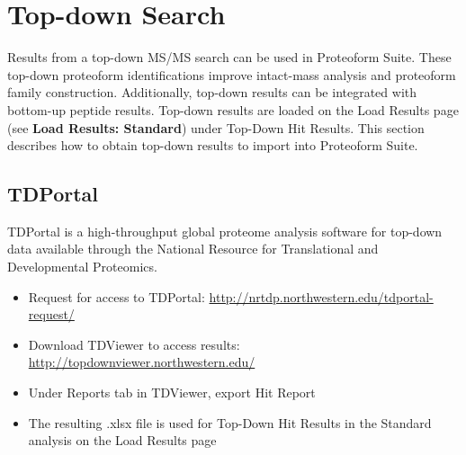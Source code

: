
\section{Top-down Search}

Results from a top-down MS/MS search can be used in Proteoform Suite. These top-down proteoform identifications improve intact-mass analysis and proteoform family construction. Additionally, top-down results can be integrated with bottom-up peptide results. Top-down results are loaded on the Load Results page (see \textbf{Load Results: Standard}) under Top-Down Hit Results. This section describes how to obtain top-down results to import into Proteoform Suite.

\subsection{TDPortal}
TDPortal is a high-throughput global proteome analysis software for top-down data\supercite{LeDuc2004,Zamdborg2007,Toby2019} available through the National Resource for Translational and Developmental Proteomics.
\begin{itemize}
\item Request for access to TDPortal: \url{http://nrtdp.northwestern.edu/tdportal-request/}
\item Download TDViewer to access results: \url{http://topdownviewer.northwestern.edu/}
\item Under Reports tab in TDViewer, export Hit Report
\item The resulting .xlsx file is used for Top-Down Hit Results in the Standard analysis on the Load Results page
\end{itemize}

